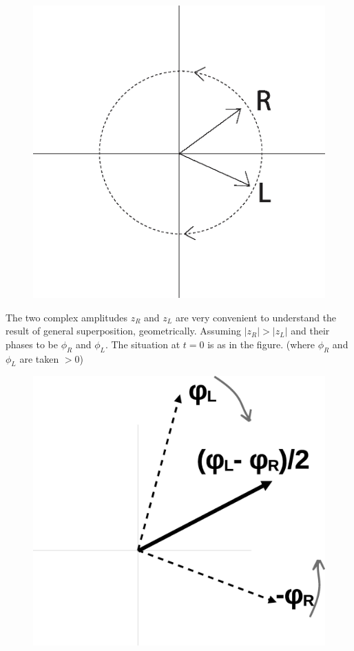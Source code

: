 \begin{figure}[H]
\centering
\includegraphics[scale=0.25]{src/images/chap26/2.jpg}
\end{figure}
\bigskip

The two complex amplitudes $z_R$ and $z_L$ are very convenient to understand
the result of general superposition, geometrically. Assuming $| z_R |>| z_L |$ and
their phases to be $\phi_R$ and $\phi_L$. The situation at $t = 0$ is as in the figure. (where $\phi_R$ and $\phi_L$ are taken $> 0$)
\medskip

\begin{figure}[H]
\centering
\includegraphics[scale=0.32]{src/images/chap26/LR_superposition.jpg}
\end{figure}
\bigskip

